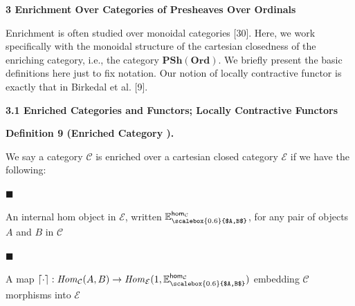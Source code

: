 \documentclass[10pt,a4paper]{article}
\begin{document}
 
 
 


 
\par\medskip\noindent\textbf{3 Enrichment Over Categories of Presheaves Over Ordinals}\par
 
 
Enrichment is often studied over monoidal categories [30]. Here, we work specifically with the monoidal structure of the cartesian closedness of the enriching category, i.e., the category $\mathbf{PSh}(\mathbf{Ord})$. We briefly present the basic definitions here just to fix notation. Our notion of locally contractive functor is exactly that in Birkedal et al. [9].\par
 
 
 
\par\medskip\noindent\textbf{3.1 Enriched Categories and Functors; Locally Contractive Functors}\par
 
 
\par\medskip\noindent\textbf{Definition 9 (Enriched Category ).}\par
 
 
We say a category $\mathcal{C}$ is enriched over a cartesian closed category $\mathcal{E}$ if we have the following:\par
  
\par\noindent  $\blacksquare$ 
 
An internal hom object in $\mathcal{E}$, written $\mathbb{E}^{\mathsf{hom}_{\mathcal{C}}}_{\scalebox{0.6}{$A,B$}}$, for any pair of objects $A$ and $B$ in $\mathcal{C}$\par
 
 
 
\par\noindent  $\blacksquare$ 
 
A map $\left\lceil{\cdot}\right\rceil:\mathit{Hom}_{\mathcal{C}}(A,B)\to\mathit{Hom}_{\mathcal{E}}(1,\mathbb{E}^{\mathsf{hom}_{\mathcal{C}}}_{\scalebox{0.6}{$A,B$}})$ embedding $\mathcal{C}$ morphisms into $\mathcal{E}$\par
 
\end{document}
